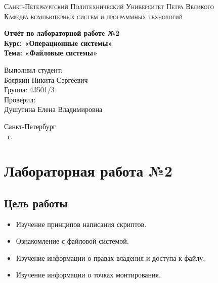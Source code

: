 \documentclass[14pt,a4paper,report]{report}
\begin{document}
\def\contentsname{Содержание}

\begin{titlepage}
	\begin{center}
		\textsc{Санкт-Петербургский Политехнический 
			Университет Петра Великого\\[5mm]
			Кафедра компьютерных систем и программных технологий}
		
		\vfill
		
		\textbf{Отчёт по лабораторной работе №2\\[3mm]
			Курс: «Операционные системы»\\[6mm]
			Тема: «Файловые системы»\\[35mm]
		}
	\end{center}
	
	\hfill
	\begin{minipage}{.5\textwidth}
		Выполнил студент:\\[2mm] 
		Бояркин Никита Сергеевич\\
		Группа: 43501/3\\[5mm]
		
		Проверил:\\[2mm] 
		Душутина Елена Владимировна
	\end{minipage}
	\vfill
	\begin{center}
		Санкт-Петербург\\ \the\year\ г.
	\end{center}
\end{titlepage}

\tableofcontents
\clearpage

\chapter{Лабораторная работа №2}

\section{Цель работы}

\begin{itemize}
	\item Изучение принципов написания скриптов.
	\item Ознакомление с файловой системой.
	\item Изучение информации о правах владения и доступа к файлу.
	\item Изучение информации о точках монтирования.
\end{itemize}
\end{document}
